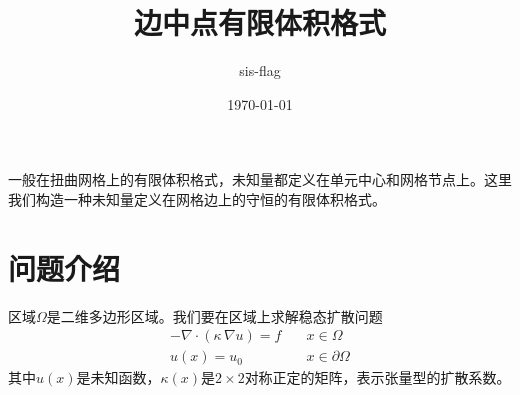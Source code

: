 \documentclass[12pt,a4paper]{article}
\title{边中点有限体积格式}
\author{sis-flag}
\date{\today}
\theoremstyle{plain}
\begin{document}
\maketitle

一般在扭曲网格上的有限体积格式，未知量都定义在单元中心和网格节点上。这里我们构造一种未知量定义在网格边上的守恒的有限体积格式。

\section*{问题介绍}

区域$\Omega$是二维多边形区域。我们要在区域上求解稳态扩散问题
\begin{equation*}
\begin{split}
- \nabla \cdot (\kappa \, \nabla u) = f & \quad x \in \Omega \\
u(x) = u_0 & \quad x \in \partial \Omega
\end{split}
\end{equation*}
其中$u(x)$是未知函数，$\kappa(x)$是$2 \times 2$对称正定的矩阵，表示张量型的扩散系数。
\end{document}
